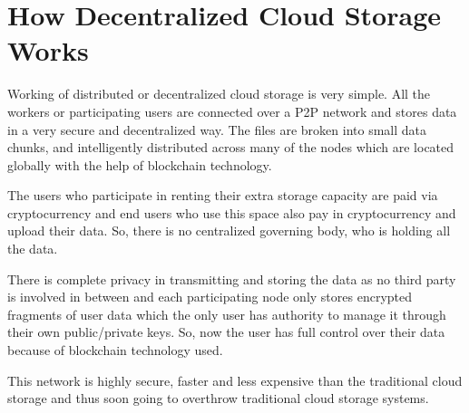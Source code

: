 \section{How Decentralized Cloud Storage Works}

Working of distributed or decentralized cloud storage is very simple. All the workers or participating users are connected over a P2P network and stores data in a very secure and decentralized way. The files are broken into small data chunks, and intelligently distributed across many of the nodes which are located globally with the help of blockchain technology.

The users who participate in renting their extra storage capacity are paid via cryptocurrency and end users who use this space also pay in cryptocurrency and upload their data. So, there is no centralized governing body, who is holding all the data.

There is complete privacy in transmitting and storing the data as no third party is involved in between and each participating node only stores encrypted fragments of user data which the only user has authority to manage it through their own public/private keys. So, now the user has full control over their data because of blockchain technology used.

This network is highly secure, faster and less expensive than the traditional cloud storage and thus soon going to overthrow traditional cloud storage systems.